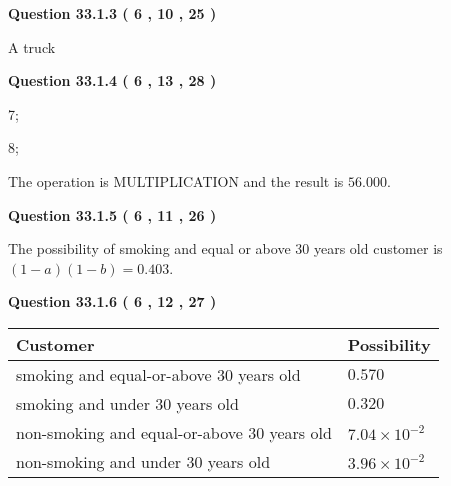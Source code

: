 \documentclass[12pt]{article}
\begin{document}
 
 
 
  
\vspace{0.2in}
  
{\textbf{\Large{Question
33.1.3 
 (           6 ,          10 ,          25 )
}}}
  
  
 
 
\noindent{}
 
 
A truck
 
 
 
 
  
\vspace{0.2in}
  
{\textbf{\Large{Question
33.1.4 
 (           6 ,          13 ,          28 )
}}}
  
  
 
 
\noindent{}

7;
 
8;
 
The operation is  %
MULTIPLICATION and the result is
$ %
56.000$.
 
 
 
  
\vspace{0.2in}
  
{\textbf{\Large{Question
33.1.5 
 (           6 ,          11 ,          26 )
}}}
  
  
 
 
\noindent{}

The possibility of  %
smoking and  %
equal or above 30 years old
customer is $ (1-a)(1-b) =  %
0.403 $.
 
 
  
\vspace{0.2in}
  
{\textbf{\Large{Question
33.1.6 
 (           6 ,          12 ,          27 )
}}}
  
  
 
 
\noindent{}

 
\noindent
\begin{tabular}{|l|l|}
\hline
Customer & Possibility \\
\hline
smoking  and  %
equal-or-above 30 years old &
  $ %
0.570$ \\
\hline
smoking  and  %
under 30 years old &
  $ %
0.320$ \\
\hline
 non-smoking and  %
equal-or-above 30 years old &
  $ %
7.04 \times 10^{-2}$ \\
\hline
 non-smoking and  %
under 30 years old &
  $ %
3.96 \times 10^{-2}$ \\
\hline
\end{tabular}
 
\end{document}
